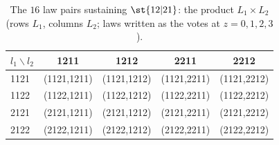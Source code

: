\begin{table}[H]
\centering\small
\caption{The $16$ law pairs sustaining $\st{12|21}$: the product $L_1\times L_2$ (rows $L_1$, columns $L_2$; laws written as the votes at $z=0,1,2,3$).}
\label{tab:laws}
\begin{tabular}{lcccc}
\toprule
$l_1\backslash l_2$ & 1211 & 1212 & 2211 & 2212 \\
\midrule
1121 & (1121,1211) & (1121,1212) & (1121,2211) & (1121,2212) \\
1122 & (1122,1211) & (1122,1212) & (1122,2211) & (1122,2212) \\
2121 & (2121,1211) & (2121,1212) & (2121,2211) & (2121,2212) \\
2122 & (2122,1211) & (2122,1212) & (2122,2211) & (2122,2212) \\
\bottomrule
\end{tabular}
\end{table}
